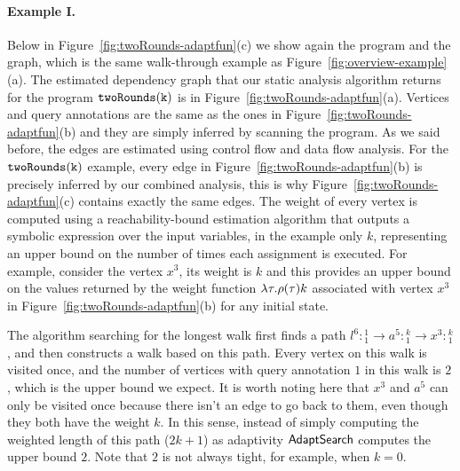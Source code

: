 \paragraph{Example I.}
Below in Figure~\ref{fig:twoRounds-adaptfun}(c) we show again the program and the graph, which is the same walk-through example as Figure~\ref{fig:overview-example}(a).
    The estimated dependency graph that our static analysis algorithm returns for the program $\mathtt{twoRounds(k)}$ is in Figure~\ref{fig:twoRounds-adaptfun}(a).
    Vertices and query annotations are the same as the ones in Figure~\ref{fig:twoRounds-adaptfun}(b) and they are simply inferred by scanning the program.
    As we said before, the edges are estimated using control flow and data flow analysis.
    For the $\mathtt{twoRounds(k)}$ example, every edge in Figure~\ref{fig:twoRounds-adaptfun}(b) is precisely inferred by our combined analysis, this is why Figure~\ref{fig:twoRounds-adaptfun}(c) contains exactly the same edges.
    The weight of every vertex is computed using a reachability-bound estimation algorithm that outputs a symbolic expression over the input variables, in the example only $k$, representing an upper bound on the number of times each assignment is executed.
    For example, consider the vertex $x^{3}$, its weight is $k$ and this provides an upper bound on the values returned by the weight function $\lambda \mathtt{\tau}. \rho(\mathtt{\tau})k$ associated with vertex $x^{3}$ in Figure~\ref{fig:twoRounds-adaptfun}(b) for any initial state. 
    
    The algorithm searching for the longest walk first finds a path $l^6:{}^1_1 \to a^5: {}^k_1 \to x^3: {}^k_1$, and then constructs a walk based on this path. Every vertex on this walk is visited once, and the number of vertices with query annotation $1$ in this walk is $2$, which is the upper bound we expect.
    {It is worth noting here that $x^3$ and $a^5$ can only be visited once because there isn't an edge to go back to them, even though they both have the weight $k$}.
    In this sense, instead of simply computing the weighted length of this path ($2k+1$) as adaptivity $\mathsf{AdaptSearch}$ computes the upper bound $2$. Note that $2$ is not always tight, for example, when $k = 0$.
    

